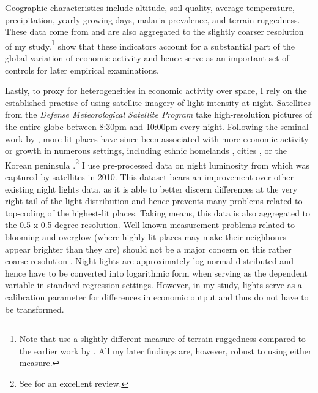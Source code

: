 \documentclass[11pt, oneside]{article}   	%
\begin{document}
Geographic characteristics include altitude, soil quality, average temperature, precipitation, yearly growing days, malaria prevalence, and terrain ruggedness. These data come from \cite{henderson_global_2018} and are also aggregated to the slightly coarser resolution of my study.\footnote{Note that \cite{henderson_global_2018} use a slightly different measure of terrain ruggedness compared to the earlier work by \cite{nunn_ruggedness:_2012}. All my later findings are, however, robust to using either measure.} \citeauthor{henderson_global_2018} show that these indicators account for a substantial part of the global variation of economic activity and hence serve as an important set of controls for later empirical examinations.

Lastly, to proxy for heterogeneities in economic activity over space, I rely on the established practise of using satellite imagery of light intensity at night. Satellites from the \textit{Defense Meteorological Satellite Program} take high-resolution pictures of the entire globe between 8:30pm and 10:00pm every night. Following the seminal work by \cite{henderson_measuring_2012}, more lit places have since been associated with more economic activity or growth in numerous settings, including ethnic homelands \citep{michalopoulos_national_2014}, cities \citep{storeygard_farther_2016}, or the Korean peninsula \citep{Lee_InternationalIsolationRegional_2016}.\footnote{See \cite{donaldson_view_2016} for an excellent review.} I use pre-processed data on night luminosity from \cite{henderson_global_2018} which was captured by satellites in 2010. This dataset bears an improvement over other existing night lights data, as it is able to better discern differences at the very right tail of the light distribution and hence prevents many problems related to top-coding of the highest-lit places. Taking means, this data is also aggregated to the 0.5 x 0.5 degree resolution. Well-known measurement problems related to blooming and overglow (where highly lit places may make their neighbours appear brighter than they are) should not be a major concern on this rather coarse resolution \citep{michalopoulos_spatial_2018}. Night lights are approximately log-normal distributed and hence have to be converted into logarithmic form when serving as the dependent variable in standard regression settings. However, in my study, lights serve as a calibration parameter for differences in economic output and thus do not have to be transformed.
\end{document}
